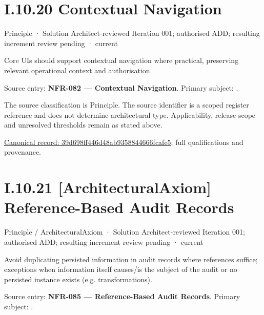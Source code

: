 \section*{I.10.20 Contextual Navigation}
\label{navigation:I.10.20}

\label{element:39d698ff446d48ab9358844666fcafe5}
{\small Principle · Solution Architect-reviewed Iteration 001; authorised ADD; resulting increment review pending · current}\par

Core UIs should support contextual navigation where practical, preserving relevant operational context and authorisation.



Source entry: \textbf{NFR-082 — Contextual Navigation}. Primary subject: \texttt{}.



The source classification is Principle. The source identifier is a scoped register reference and does not determine architectural type. Applicability, release scope and unresolved thresholds remain as stated above.


{\footnotesize \href{../../../../continuum/motivation/principle/39d698ff446d48ab9358844666fcafe5.md}{Canonical record: 39d698ff446d48ab9358844666fcafe5}; full qualifications and provenance.}\par
\section*{I.10.21 [ArchitecturalAxiom] Reference-Based Audit Records}
\label{navigation:I.10.21}

\label{element:9202f9b1adf84d4882a507a2d7280710}
{\small Principle / ArchitecturalAxiom · Solution Architect-reviewed Iteration 001; authorised ADD; resulting increment review pending · current}\par

Avoid duplicating persisted information in audit records where references suffice; exceptions when information itself causes/is the subject of the audit or no persisted instance exists (e.g. transformations).



Source entry: \textbf{NFR-085 — Reference-Based Audit Records}. Primary subject: \texttt{}.



